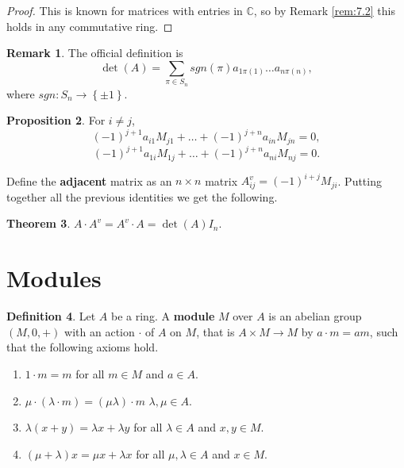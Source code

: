 \documentclass{article}
\newcommand{\C}{\mathbb{C}}
\newcommand{\rb}[1]{\left( #1 \right)}
\newcommand{\cb}[1]{\left\{ #1 \right\}}
\theoremstyle{definition}\newtheorem{definition}{Definition}[section]
\theoremstyle{definition}\newtheorem{remark}[definition]{Remark}
\theoremstyle{definition}\newtheorem*{example}{Example}
\theoremstyle{definition}\newtheorem*{note}{Note}
\newtheorem{proposition}[definition]{Proposition}
\newtheorem{theorem}[definition]{Theorem}
\begin{document}
\begin{proof}
This is known for matrices with entries in $ \C $, so by Remark \ref{rem:7.2} this holds in any commutative ring.
\end{proof}

\begin{remark}
The official definition is
$$ \det\rb{A} = \sum_{\pi \in S_n} sgn\rb{\pi}a_{1\pi\rb{1}} \dots a_{n\pi\rb{n}}, $$
where $ sgn : S_n \to \cb{\pm 1} $.
\end{remark}

\begin{proposition}
For $ i \ne j $,
$$ \rb{-1}^{j + 1}a_{i1}M_{j1} + \dots + \rb{-1}^{j + n}a_{in}M_{jn} = 0, $$
$$ \rb{-1}^{j + 1}a_{1i}M_{1j} + \dots + \rb{-1}^{j + n}a_{ni}M_{nj} = 0. $$
\end{proposition}

Define the \textbf{adjacent} matrix as an $ n \times n $ matrix $ A^v_{ij} = \rb{-1}^{i + j}M_{ji} $. Putting together all the previous identities we get the following.

\begin{theorem}
$ A \cdot A^v = A^v \cdot A = \det\rb{A} I_n $.
\end{theorem}


\section{Modules}

\begin{definition}
Let $ A $ be a ring. A \textbf{module} $ M $ over $ A $ is an abelian group $ \rb{M, 0, +} $ with an action $ \cdot $ of $ A $ on $ M $, that is $ A \times M \to M $ by $ a \cdot m = am $, such that the following axioms hold.
\begin{enumerate}
\item $ 1 \cdot m = m $ for all $ m \in M $ and $ a \in A $.
\item $ \mu \cdot \rb{\lambda \cdot m} = \rb{\mu\lambda} \cdot m $ $ \lambda, \mu \in A $.
\item $ \lambda\rb{x + y} = \lambda x + \lambda y $ for all $ \lambda \in A $ and $ x, y \in M $.
\item $ \rb{\mu + \lambda}x = \mu x + \lambda x $ for all $ \mu, \lambda \in A $ and $ x \in M $.
\end{enumerate}
\end{definition}
\end{document}
